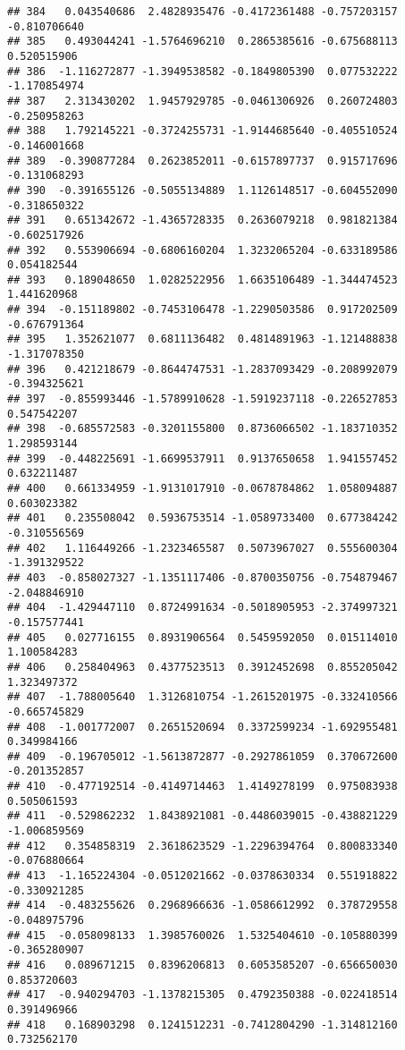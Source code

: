 \documentclass[
]{article}
\begin{document}
\begin{verbatim}
## 384   0.043540686  2.4828935476 -0.4172361488 -0.757203157 -0.810706640
## 385   0.493044241 -1.5764696210  0.2865385616 -0.675688113  0.520515906
## 386  -1.116272877 -1.3949538582 -0.1849805390  0.077532222 -1.170854974
## 387   2.313430202  1.9457929785 -0.0461306926  0.260724803 -0.250958263
## 388   1.792145221 -0.3724255731 -1.9144685640 -0.405510524 -0.146001668
## 389  -0.390877284  0.2623852011 -0.6157897737  0.915717696 -0.131068293
## 390  -0.391655126 -0.5055134889  1.1126148517 -0.604552090 -0.318650322
## 391   0.651342672 -1.4365728335  0.2636079218  0.981821384 -0.602517926
## 392   0.553906694 -0.6806160204  1.3232065204 -0.633189586  0.054182544
## 393   0.189048650  1.0282522956  1.6635106489 -1.344474523  1.441620968
## 394  -0.151189802 -0.7453106478 -1.2290503586  0.917202509 -0.676791364
## 395   1.352621077  0.6811136482  0.4814891963 -1.121488838 -1.317078350
## 396   0.421218679 -0.8644747531 -1.2837093429 -0.208992079 -0.394325621
## 397  -0.855993446 -1.5789910628 -1.5919237118 -0.226527853  0.547542207
## 398  -0.685572583 -0.3201155800  0.8736066502 -1.183710352  1.298593144
## 399  -0.448225691 -1.6699537911  0.9137650658  1.941557452  0.632211487
## 400   0.661334959 -1.9131017910 -0.0678784862  1.058094887  0.603023382
## 401   0.235508042  0.5936753514 -1.0589733400  0.677384242 -0.310556569
## 402   1.116449266 -1.2323465587  0.5073967027  0.555600304 -1.391329522
## 403  -0.858027327 -1.1351117406 -0.8700350756 -0.754879467 -2.048846910
## 404  -1.429447110  0.8724991634 -0.5018905953 -2.374997321 -0.157577441
## 405   0.027716155  0.8931906564  0.5459592050  0.015114010  1.100584283
## 406   0.258404963  0.4377523513  0.3912452698  0.855205042  1.323497372
## 407  -1.788005640  1.3126810754 -1.2615201975 -0.332410566 -0.665745829
## 408  -1.001772007  0.2651520694  0.3372599234 -1.692955481  0.349984166
## 409  -0.196705012 -1.5613872877 -0.2927861059  0.370672600 -0.201352857
## 410  -0.477192514 -0.4149714463  1.4149278199  0.975083938  0.505061593
## 411  -0.529862232  1.8438921081 -0.4486039015 -0.438821229 -1.006859569
## 412   0.354858319  2.3618623529 -1.2296394764  0.800833340 -0.076880664
## 413  -1.165224304 -0.0512021662 -0.0378630334  0.551918822 -0.330921285
## 414  -0.483255626  0.2968966636 -1.0586612992  0.378729558 -0.048975796
## 415  -0.058098133  1.3985760026  1.5325404610 -0.105880399 -0.365280907
## 416   0.089671215  0.8396206813  0.6053585207 -0.656650030  0.853720603
## 417  -0.940294703 -1.1378215305  0.4792350388 -0.022418514  0.391496966
## 418   0.168903298  0.1241512231 -0.7412804290 -1.314812160  0.732562170

\end{verbatim}
\end{document}
